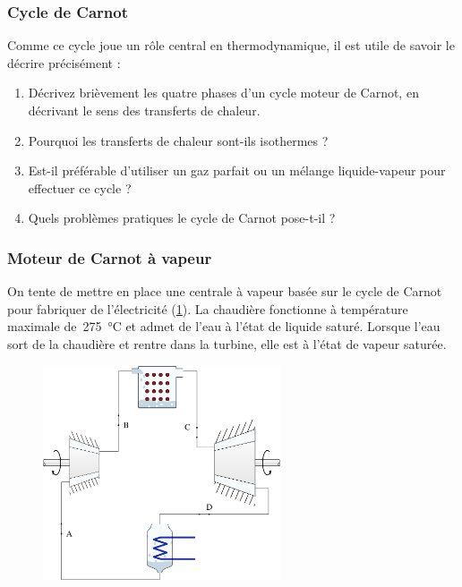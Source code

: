 \subsubsection{Cycle de Carnot}
\label{exo_cours_carnot}

	Comme ce cycle joue un rôle central en thermodynamique, il est utile de savoir le décrire précisément :
	
	\begin{enumerate}
	
		\item Décrivez brièvement les quatre phases d’un cycle moteur de Carnot, en décrivant le sens des transferts de chaleur.
	
		\item Pourquoi les transferts de chaleur sont-ils isothermes ?
		
		\item Est-il préférable d’utiliser un gaz parfait ou un mélange liquide-vapeur pour effectuer ce cycle ?
		
		\item Quels problèmes pratiques le cycle de Carnot pose-t-il ? 

	\end{enumerate}


\subsubsection{Moteur de Carnot à vapeur}
\label{exo_moteur_carnot_vapeur}

	On tente de mettre en place une centrale à vapeur basée sur le cycle de Carnot pour fabriquer de l’électricité (\cref{fig_exo_carnot_circuit_vapeur}). La chaudière fonctionne à température maximale de~\SI{275}{\degreeCelsius} et admet de l’eau à l’état de liquide saturé. Lorsque l’eau sort de la chaudière et rentre dans la turbine, elle est à l’état de vapeur saturée.

	\begin{figure}[hc]%
		\begin{center}
			\includegraphics[width=7cm]{images/circuit_carnot_vapeur.png}
		\end{center}
		\label{fig_exo_carnot_circuit_vapeur}
	\end{figure}
	

